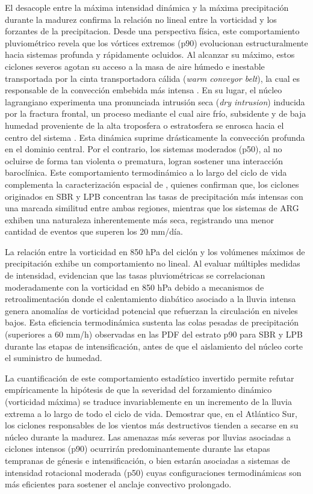 El desacople entre la máxima intensidad dinámica y la máxima precipitación durante la madurez confirma la relación no lineal entre la vorticidad y los forzantes de la precipitacion. Desde una perspectiva física, este comportamiento pluviométrico revela que los vórtices extremos (p90) evolucionan estructuralmente hacia sistemas profunda y rápidamente ocluidos. Al alcanzar su máximo, estos ciclones severos agotan su acceso a la masa de aire húmedo e inestable transportada por la cinta transportadora cálida (\textit{warm conveyor belt}), la cual es responsable de la convección embebida más intensa \citep{oertel2021warm, blanchard2021warm}. En su lugar, el núcleo lagrangiano experimenta una pronunciada intrusión seca (\textit{dry intrusion}) inducida por la fractura frontal, un proceso mediante el cual aire frío, subsidente y de baja humedad proveniente de la alta troposfera o estratosfera se enrosca hacia el centro del sistema \citep{shapiro1999bridge}. Esta dinámica suprime drásticamente la convección profunda en el dominio central. Por el contrario, los sistemas moderados (p50), al no ocluirse de forma tan violenta o prematura, logran sostener una interacción baroclínica. Este comportamiento termodinámico a lo largo del ciclo de vida complementa la caracterización espacial de \citet{gramcianinov2019properties}, quienes confirman que, los ciclones originados en SBR y LPB concentran las tasas de precipitación más intensas con una marcada similitud entre ambas regiones, mientras que los sistemas de ARG exhiben una naturaleza inherentemente más seca, registrando una menor cantidad de eventos que superen los 20 mm/día.

La relación entre la vorticidad en 850 hPa del ciclón y los volúmenes máximos de precipitación exhibe un comportamiento no lineal. Al evaluar múltiples medidas de intensidad, \citet{corner2025classification} evidencian que las tasas pluviométricas se correlacionan moderadamente con la vorticidad en 850 hPa debido a mecanismos de retroalimentación donde el calentamiento diabático asociado a la lluvia intensa genera anomalías de vorticidad potencial que refuerzan la circulación en niveles bajos. Esta eficiencia termodinámica sustenta las colas pesadas de precipitación (superiores a 60 mm/h) observadas en las PDF del estrato p90 para SBR y LPB durante las etapas de intensificación, antes de que el aislamiento del núcleo corte el suministro de humedad.

La cuantificación de este comportamiento estadístico invertido permite refutar empíricamente la hipótesis de que la severidad del forzamiento dinámico (vorticidad máxima) se traduce invariablemente en un incremento de la lluvia extrema a lo largo de todo el ciclo de vida. Demostrar que, en el Atlántico Sur, los ciclones responsables de los vientos más destructivos tienden a secarse en su núcleo durante la madurez. Las amenazas más severas por lluvias asociadas a ciclones intensos (p90) ocurrirán predominantemente durante las etapas tempranas de génesis e intensificación, o bien estarán asociadas a sistemas de intensidad rotacional moderada (p50) cuyas configuraciones termodinámicas son más eficientes para sostener el anclaje convectivo prolongado.

